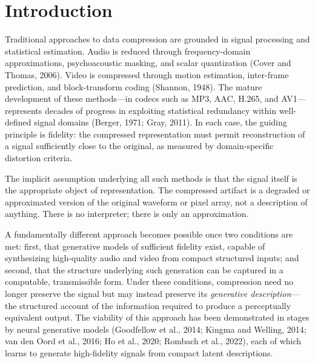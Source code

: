 \documentclass[11pt,a4paper]{article}
\theoremstyle{definition}
\theoremstyle{remark}
\begin{document}
\newpage

\tableofcontents

\newpage

\section{Introduction}
\label{sec:intro}

Traditional approaches to data compression are grounded in signal processing and statistical estimation. Audio is reduced through frequency-domain approximations, psychoacoustic masking, and scalar quantization (Cover and Thomas, 2006). Video is compressed through motion estimation, inter-frame prediction, and block-transform coding (Shannon, 1948). The mature development of these methods---in codecs such as MP3, AAC, H.265, and AV1---represents decades of progress in exploiting statistical redundancy within well-defined signal domains (Berger, 1971; Gray, 2011). In each case, the guiding principle is fidelity: the compressed representation must permit reconstruction of a signal sufficiently close to the original, as measured by domain-specific distortion criteria.

The implicit assumption underlying all such methods is that the signal itself is the appropriate object of representation. The compressed artifact is a degraded or approximated version of the original waveform or pixel array, not a description of anything. There is no interpreter; there is only an approximation.

A fundamentally different approach becomes possible once two conditions are met: first, that generative models of sufficient fidelity exist, capable of synthesizing high-quality audio and video from compact structured inputs; and second, that the structure underlying such generation can be captured in a computable, transmissible form. Under these conditions, compression need no longer preserve the signal but may instead preserve its \emph{generative description}---the structured account of the information required to produce a perceptually equivalent output. The viability of this approach has been demonstrated in stages by neural generative models (Goodfellow et al., 2014; Kingma and Welling, 2014; van den Oord et al., 2016; Ho et al., 2020; Rombach et al., 2022), each of which learns to generate high-fidelity signals from compact latent descriptions.
\end{document}
